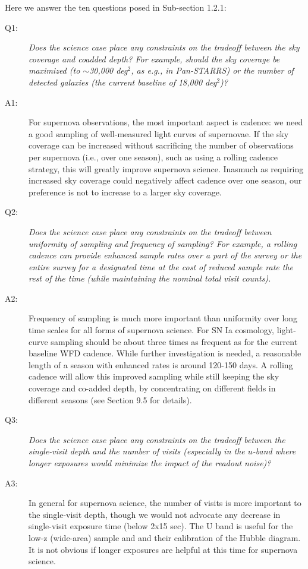 Here we answer the ten questions posed in Sub-section 1.2.1:

\begin{description}
\item[Q1:] {\it Does the science case place any constraints on the
tradeoff between the sky coverage and coadded depth? For example, should
the sky coverage be maximized (to $\sim$30,000 deg$^2$, as e.g., in
Pan-STARRS) or the number of detected galaxies (the current baseline 
of 18,000 deg$^2$)?}

\item[A1:] For supernova observations, the most important aspect is cadence: we need a
good sampling of well-measured light curves of supernovae. If the sky
coverage can be increased without sacrificing the number of observations
per supernova (i.e., over one season), such as using a rolling cadence
strategy, this will greatly improve supernova science. Inasmuch as
requiring increased sky coverage could negatively affect cadence over one
season, our preference is not to increase to a larger sky coverage.

\item[Q2:] {\it Does the science case place any constraints on the
tradeoff between uniformity of sampling and frequency of  sampling? For
example, a rolling cadence can provide enhanced sample rates over a part
of the survey or the entire survey for a designated time at the cost of
reduced sample rate the rest of the time (while maintaining the nominal
total visit counts).}


\item[A2:] Frequency of sampling is much more important than uniformity over long time
scales for all forms of supernova science. For SN Ia cosmology, light-curve
sampling should be about three times as frequent as for the current
baseline WFD cadence. While further investigation is needed, a reasonable
length of a season with enhanced rates is around 120-150 days. A rolling
cadence will allow this improved sampling while still keeping the sky
coverage and co-added depth, by concentrating on different fields in
different seasons (see Section 9.5 for details).

\item[Q3:] {\it Does the science case place any constraints on the
tradeoff between the single-visit depth and the number of visits
(especially in the $u$-band where longer exposures would minimize the
impact of the readout noise)?}

\item[A3:] In general for supernova science, the number of visits is more important to
the single-visit depth, though we would not advocate any decrease in
single-visit exposure time (below 2x15 sec). The U band  is useful for the
low-z (wide-area) sample and and their calibration of the Hubble diagram.
It is not obvious if longer exposures are helpful at this time for
supernova science.


\end{description}
